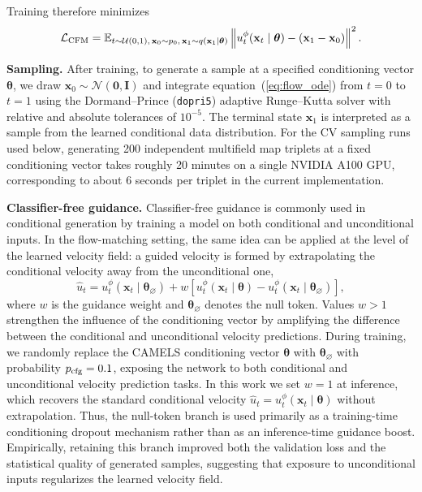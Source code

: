 \documentclass[usenatbib]{mnras}
\newcommand{\thetavec}{\boldsymbol{\theta}}
\begin{document}
Training therefore minimizes
\begin{equation}
  \mathcal{L}_{\rm CFM} =
  \mathbb{E}_{t\sim\mathcal{U}(0,1),\,
  \mathbf{x}_0\sim p_0,\,
  \mathbf{x}_1\sim q(\mathbf{x}_1\mid\thetavec)}
  \left\|
    u_t^\phi(\mathbf{x}_t\mid\thetavec)
    - (\mathbf{x}_1-\mathbf{x}_0)
  \right\|^2 .
  \label{eq:cfm}
\end{equation}

\textbf{Sampling.}
After training, to generate a sample at a specified
conditioning vector $\thetavec$, we draw
$\mathbf{x}_0 \sim \mathcal{N}(\mathbf{0},\mathbf{I})$ and integrate
equation~(\ref{eq:flow_ode}) from $t=0$ to $t=1$ using the
Dormand--Prince (\texttt{dopri5}) adaptive Runge--Kutta solver with
relative and absolute tolerances of $10^{-5}$. The terminal state
$\mathbf{x}_{1}$ is interpreted as a sample from the learned
conditional data distribution. For the CV sampling runs used below,
generating 200 independent multifield map triplets at a fixed
conditioning vector takes roughly 20 minutes on a single NVIDIA A100
GPU, corresponding to about 6 seconds per triplet in the current
implementation.

\textbf{Classifier-free guidance.}
Classifier-free guidance \citep[CFG;][]{Ho2022} is commonly used in
conditional generation by training a model on both conditional and
unconditional inputs. In the flow-matching setting, the same idea can
be applied at the level of the learned velocity field: a guided
velocity is formed by extrapolating the conditional velocity away from
the unconditional one,
\begin{equation}
  \hat{u}_t
  =
  u_t^\phi(\mathbf{x}_t \mid \thetavec_\varnothing)
  + w\left[
    u_t^\phi(\mathbf{x}_t \mid \thetavec)
    - u_t^\phi(\mathbf{x}_t \mid \thetavec_\varnothing)
  \right],
  \label{eq:cfg}
\end{equation}
where $w$ is the guidance weight and $\thetavec_\varnothing$ denotes
the null token. Values $w>1$ strengthen the influence of the
conditioning vector by amplifying the difference between the
conditional and unconditional velocity predictions.
During training, we randomly replace the CAMELS conditioning vector
$\thetavec$ with $\thetavec_\varnothing$ with probability
$p_{\rm cfg}=0.1$, exposing the network to both conditional and
unconditional velocity prediction tasks. In this work we set $w=1$ at
inference, which recovers the standard conditional velocity
$\hat{u}_t = u_t^\phi(\mathbf{x}_t \mid \thetavec)$ without
extrapolation. Thus, the null-token branch is used primarily as a
training-time conditioning dropout mechanism rather than as an
inference-time guidance boost. Empirically, retaining this branch
improved both the validation loss and the statistical quality of
generated samples, suggesting that exposure to unconditional inputs
regularizes the learned velocity field.
\end{document}
